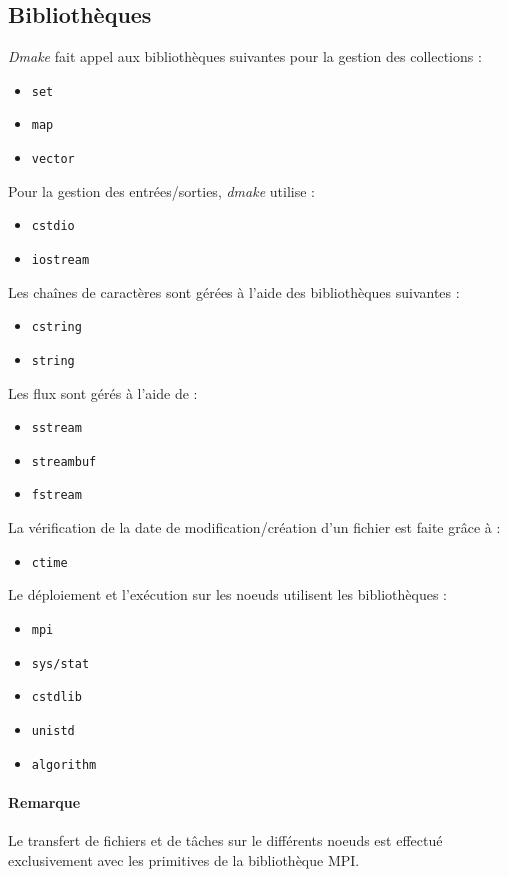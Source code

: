 \documentclass[a4paper,12pt,twoside]{article}
\begin{document}
\subsection{Bibliothèques}

\emph{Dmake} fait appel aux bibliothèques suivantes pour la gestion
des collections :
\begin{itemize}
\item \texttt{set}
\item \texttt{map}
\item \texttt{vector}
\end{itemize}

Pour la gestion des entrées/sorties, \emph{dmake} utilise :
\begin{itemize}
\item \texttt{cstdio}
\item \texttt{iostream}
\end{itemize}

Les chaînes de caractères sont gérées à l'aide des bibliothèques
suivantes :
\begin{itemize}
\item \texttt{cstring}
\item \texttt{string}
\end{itemize}

Les flux sont gérés à l'aide de :
\begin{itemize}
\item \texttt{sstream}
\item \texttt{streambuf}
\item \texttt{fstream}
\end{itemize}

La vérification de la date de modification/création d'un fichier est
faite grâce à :
\begin{itemize}
\item \texttt{ctime}
\end{itemize}

Le déploiement et l'exécution sur les noeuds utilisent les bibliothèques :
\begin{itemize}
\item \texttt{mpi}
\item \texttt{sys/stat}
\item \texttt{cstdlib}
\item \texttt{unistd}
\item \texttt{algorithm}
\end{itemize}

\paragraph{Remarque}
Le transfert de fichiers et de tâches sur le différents noeuds est
effectué exclusivement avec les primitives de la bibliothèque MPI.
\end{document}
